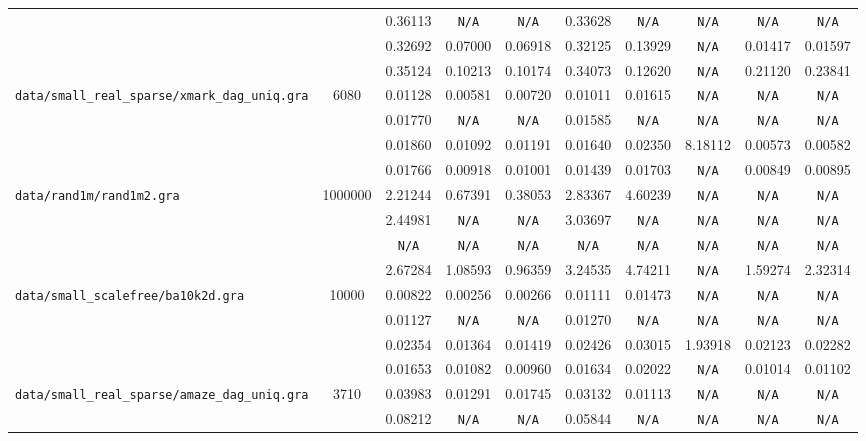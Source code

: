 \documentclass[12pt,a4paper,twoside]{article}
\begin{document}
{\begin{tabular}{ | l | c | c | c | c | c | c | c | c | c | }
\verb| | &  & 0.36113 & \verb|N/A| & \verb|N/A| & 0.33628 & \verb|N/A| & \verb|N/A| & \verb|N/A| & \verb|N/A| \\
\verb| | &  & 0.32692 & 0.07000 & 0.06918 & 0.32125 & 0.13929 & \verb|N/A| & 0.01417 & 0.01597 \\
\verb| | &  & 0.35124 & 0.10213 & 0.10174 & 0.34073 & 0.12620 & \verb|N/A| & 0.21120 & 0.23841 \\
\hline
\verb|data/small_real_sparse/xmark_dag_uniq.gra| & 6080 & 0.01128 & 0.00581 & 0.00720 & 0.01011 & 0.01615 & \verb|N/A| & \verb|N/A| & \verb|N/A| \\
\verb| | &  & 0.01770 & \verb|N/A| & \verb|N/A| & 0.01585 & \verb|N/A| & \verb|N/A| & \verb|N/A| & \verb|N/A| \\
\verb| | &  & 0.01860 & 0.01092 & 0.01191 & 0.01640 & 0.02350 & 8.18112 & 0.00573 & 0.00582 \\
\verb| | &  & 0.01766 & 0.00918 & 0.01001 & 0.01439 & 0.01703 & \verb|N/A| & 0.00849 & 0.00895 \\
\hline
\verb|data/rand1m/rand1m2.gra| & 1000000 & 2.21244 & 0.67391 & 0.38053 & 2.83367 & 4.60239 & \verb|N/A| & \verb|N/A| & \verb|N/A| \\
\verb| | &  & 2.44981 & \verb|N/A| & \verb|N/A| & 3.03697 & \verb|N/A| & \verb|N/A| & \verb|N/A| & \verb|N/A| \\
\verb| | &  & \verb|N/A| & \verb|N/A| & \verb|N/A| & \verb|N/A| & \verb|N/A| & \verb|N/A| & \verb|N/A| & \verb|N/A| \\
\verb| | &  & 2.67284 & 1.08593 & 0.96359 & 3.24535 & 4.74211 & \verb|N/A| & 1.59274 & 2.32314 \\
\hline
\verb|data/small_scalefree/ba10k2d.gra| & 10000 & 0.00822 & 0.00256 & 0.00266 & 0.01111 & 0.01473 & \verb|N/A| & \verb|N/A| & \verb|N/A| \\
\verb| | &  & 0.01127 & \verb|N/A| & \verb|N/A| & 0.01270 & \verb|N/A| & \verb|N/A| & \verb|N/A| & \verb|N/A| \\
\verb| | &  & 0.02354 & 0.01364 & 0.01419 & 0.02426 & 0.03015 & 1.93918 & 0.02123 & 0.02282 \\
\verb| | &  & 0.01653 & 0.01082 & 0.00960 & 0.01634 & 0.02022 & \verb|N/A| & 0.01014 & 0.01102 \\
\hline
\verb|data/small_real_sparse/amaze_dag_uniq.gra| & 3710 & 0.03983 & 0.01291 & 0.01745 & 0.03132 & 0.01113 & \verb|N/A| & \verb|N/A| & \verb|N/A| \\
\verb| | &  & 0.08212 & \verb|N/A| & \verb|N/A| & 0.05844 & \verb|N/A| & \verb|N/A| & \verb|N/A| & \verb|N/A| \\

\end{tabular}}
\end{document}
